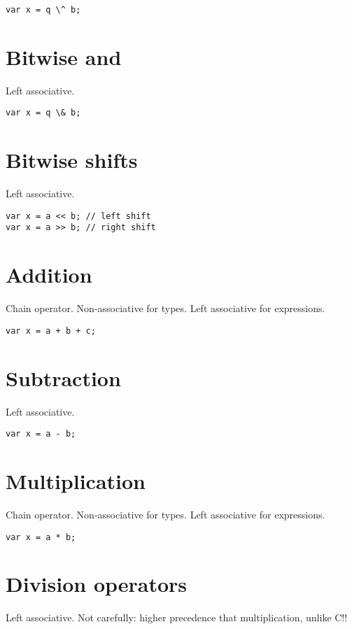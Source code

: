 \documentclass[oneside]{book}
\begin{document}
\begin{verbatim}
var x = q \^ b;
\end{verbatim}


\section{Bitwise and}
Left associative.

\begin{verbatim}
var x = q \& b;
\end{verbatim}


\section{Bitwise shifts}
Left associative.

\begin{verbatim}
var x = a << b; // left shift
var x = a >> b; // right shift
\end{verbatim}


\section{Addition}
Chain operator. Non-associative for types. 
Left associative for expressions.

\begin{verbatim}
var x = a + b + c;
\end{verbatim}


\section{Subtraction}
Left associative.

\begin{verbatim}
var x = a - b;
\end{verbatim}


\section{Multiplication}
Chain operator. Non-associative for types.
Left associative for expressions.

\begin{verbatim}
var x = a * b;
\end{verbatim}


\section{Division operators}
Left associative. Not carefully: higher precedence
that multiplication, unlike C!!
\end{document}
